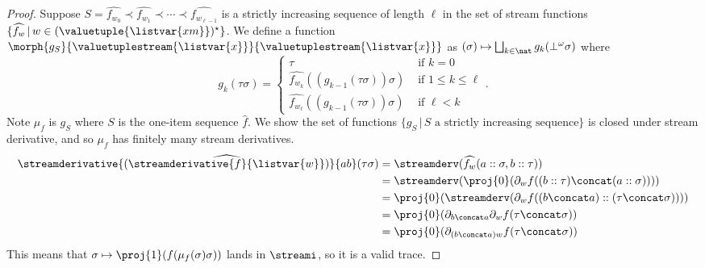 \begin{proof}
    Suppose \(
        S = \widehat{f_{w_0}} \prec \widehat{f_{w_1}} \prec \cdots \prec
            \widehat{f_{w_{\ell-1}}}
    \) is a strictly increasing sequence of length \(\ell\) in the set of stream
    functions \(
        \{\widehat{f_w} \,|\, w \in (\valuetuple{\listvar{xm}})^\star\}
    \).
    We define a function \(
        \morph{g_S}{
            \valuetuplestream{\listvar{x}}
        }{
            \valuetuplestream{\listvar{x}}
        }
    \) as \(
        (\sigma) \mapsto \bigsqcup_{k \in \nat} g_k(\bot^\omega\sigma)
    \) where \[
        g_k(\tau\sigma) =
        \begin{cases}
            \tau & \text{ if } k = 0 \\
            \widehat{f_{w_k}}(\left(g_{k-1}(\tau\sigma)\right)\sigma) & \text{ if } 1 \leq k \leq \ell \\
            \widehat{f_{w_\ell}}(\left(g_{k-1}(\tau\sigma)\right)\sigma) & \text{ if } \ell < k
        \end{cases}.
    \]
    Note \(\mu_f\) is \(g_S\) where \(S\) is the one-item sequence
    \(\widehat{f}\).
    We show the set of functions \(
        \{g_S \,|\, S \text{ a strictly increasing sequence}\}
    \) is closed under stream derivative, and so \(\mu_f\) has finitely many
    stream derivatives.
    \begin{align*}
        \streamderivative{(\widehat{\streamderivative{f}{\listvar{w}}})}{ab}(\tau\sigma)
            &= \streamderv(\widehat{f_w}(a::\sigma, b::\tau))\\
            &= \streamderv(\proj{0}(\partial_w f((b::\tau) \concat (a::\sigma)))) \\
            &= \proj{0}(\streamderv(\partial_w f((b\concat a)::(\tau\concat\sigma)))) \\
            &= \proj{0}(\partial_{b\concat a}\partial_w f(\tau\concat\sigma))\\
            &= \proj{0}(\partial_{(b\concat a)w} f(\tau\concat\sigma))
    \end{align*}
    This means that \(\sigma \mapsto \proj{1}(f(\mu_f(\sigma)\sigma))\) lands
    in \(\streami\), so it is a valid trace.
\end{proof}